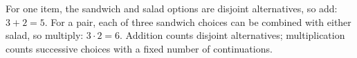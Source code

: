 For one item, the sandwich and salad options are disjoint alternatives, so add: $ 3+2=\boxed5 $. For a pair, each of three sandwich choices can be combined with either salad, so multiply: $ 3\cdot2=\boxed6 $. Addition counts disjoint alternatives; multiplication counts successive choices with a fixed number of continuations.
